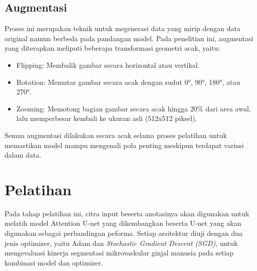 \subsection{Augmentasi}

\noindent Proses ini merupakan teknik untuk megenerasi  data yang mirip dengan data original namun berbeda pada pandangan model. Pada penelitian ini, augmentasi yang diterapkan meliputi beberapa transformasi geometri acak, yaitu:
\begin{itemize}
	\item Flipping: Membalik gambar secara horizontal atau vertikal.
	\item Rotation: Memutar gambar secara acak dengan sudut 0°, 90°, 180°, atau 270°.
	\item Zooming: Memotong bagian gambar secara acak hingga 20\% dari area awal, lalu memperbesar kembali ke ukuran asli (512x512 piksel).
\end{itemize}

\noindent Semua augmentasi dilakukan secara acak selama proses pelatihan untuk memastikan model mampu mengenali pola penting meskipun terdapat variasi dalam data.





\section{Pelatihan}
\noindent Pada tahap pelatihan ini, citra input beserta anotasinya akan digunakan untuk melatih model Attention U-net yang dikembangkan beserta U-net yang akan digunakan sebagai perbandingan peforma. Setiap arsitektur diuji dengan dua jenis optimizer, yaitu Adam dan \textit{Stochastic Gradient Descent (SGD)}, untuk mengevaluasi kinerja segmentasi mikrovaskular ginjal manusia pada setiap kombinasi model dan optimizer.

